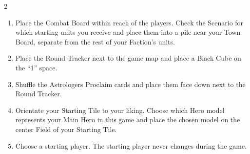 \begin{multicols*}{2}
\begin{enumerate}[leftmargin=2.3em]
    Shuffle these Decks and leave enough room for their Discard Piles.
  \item Place the Combat Board within reach of the players.
    Check the Scenario for which starting units you receive and place them into a pile near your Town Board, separate from the rest of your Faction’s units.
  \item Place the Round Tracker next to the game map and place a Black Cube on the ``1'' space.
  \item Shuffle the Astrologers Proclaim cards and place them face down next to the Round Tracker.
  \item Orientate your Starting Tile to your liking.
    Choose which Hero model represents your Main Hero in this game and place the chosen model on the center Field of your Starting Tile.
  \item Choose a starting player. The starting player never changes during the game.
\end{enumerate}


\end{multicols*}
